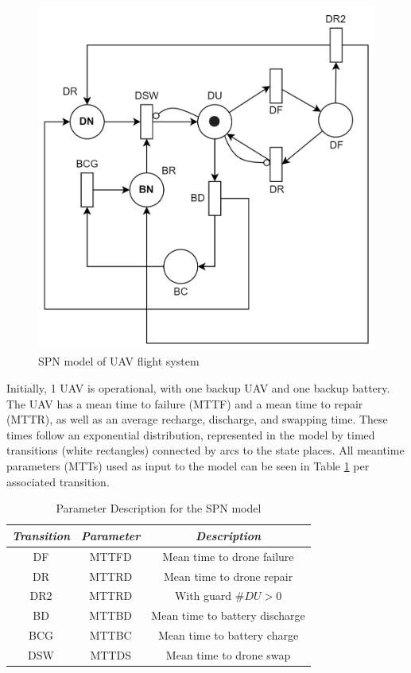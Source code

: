 \documentclass[conference]{IEEEtran}
\begin{document}
\begin{figure}[htbp]
\centerline{\includegraphics[scale=0.7]{img/SPN_transparent.png}}
\caption{SPN model of UAV flight system}
\label{fig:spn_model}
\end{figure}

Initially, 1 UAV is operational, with one backup UAV and one backup battery. The UAV has a mean time to failure (MTTF) and a mean time to repair (MTTR), as well as an average recharge, discharge, and swapping time. These times follow an exponential distribution, represented in the model by timed transitions (white rectangles) connected by arcs to the state places. All meantime parameters (MTTs) used as input to the model can be seen in Table \ref{tab:spn_parameter_description} per associated transition.

\begin{table}[htbp]
\caption{Parameter Description for the SPN model}
\begin{center}
\begin{tabular}{c|c|c}
\hline
\textbf{\textit{Transition}} & \textbf{\textit{Parameter}}& \textbf{\textit{Description}} \\
\hline
\hline
 DF & MTTFD & Mean time to drone failure \\
 DR & MTTRD & Mean time to drone repair\\
 DR2 & MTTRD & With guard \textbf{$\#DU>0$} \\
 BD & MTTBD & Mean time to battery discharge \\ 
 BCG & MTTBC & Mean time to battery charge \\
 DSW & MTTDS & Mean time to drone swap  \\
\hline
\end{tabular}
\label{tab:spn_parameter_description}
\end{center}
\end{table}
\end{document}
